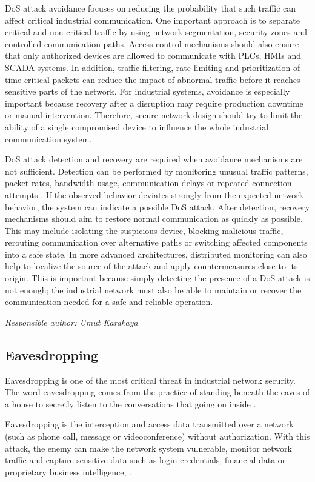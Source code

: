 \documentclass[conference]{IEEEtran}
\begin{document}
DoS attack avoidance focuses on reducing the probability that such traffic can affect critical industrial communication. One important approach is to separate critical and non-critical traffic by using network segmentation, security zones and controlled communication paths. Access control mechanisms should also ensure that only authorized devices are allowed to communicate with PLCs, HMIs and SCADA systems. In addition, traffic filtering, rate limiting and prioritization of time-critical packets can reduce the impact of abnormal traffic before it reaches sensitive parts of the network. For industrial systems, avoidance is especially important because recovery after a disruption may require production downtime or manual intervention. Therefore, secure network design should try to limit the ability of a single compromised device to influence the whole industrial communication system. 

DoS attack detection and recovery are required when avoidance mechanisms are not sufficient. Detection can be performed by monitoring unusual traffic patterns, packet rates, bandwidth usage, communication delays or repeated connection attempts \cite{b3}. If the observed behavior deviates strongly from the expected network behavior, the system can indicate a possible DoS attack. After detection, recovery mechanisms should aim to restore normal communication as quickly as possible. This may include isolating the suspicious device, blocking malicious traffic, rerouting communication over alternative paths or switching affected components into a safe state. In more advanced architectures, distributed monitoring can also help to localize the source of the attack and apply countermeasures close to its origin. This is important because simply detecting the presence of a DoS attack is not enough; the industrial network must also be able to maintain or recover the communication needed for a safe and reliable operation.


\textit{Responsible author: Umut Karakaya}
\subsection{Eavesdropping}
Eavesdropping is one of the most critical threat in industrial network security. The word eavesdropping comes from the practice of standing beneath the eaves of a house to secretly listen to the conversations that going on inside \cite{b4}.

Eavesdropping is the interception and access data transmitted over a network (such as  phone call,  message or videoconference) without authorization. With this attack, the enemy can make the network system vulnerable, monitor network traffic and capture sensitive data such as login credentials, financial data or proprietary business intelligence\cite{b4}, \cite{b5}.
\end{document}
